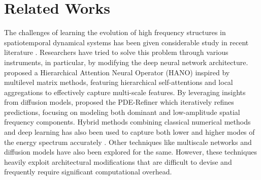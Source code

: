 \section{Related Works}
The challenges of learning the evolution of high frequency structures in spatiotemporal dynamical systems has been given considerable study in recent literature \citep{karniadakis2021physics,lai2024machine,chakraborty2024divide,chen2024physics}. Researchers have tried to solve this problem through various instruments, in particular, by modifying the deep neural network architecture. \citep{liu2024mitigating} proposed a Hierarchical Attention Neural Operator (HANO) inspired by multilevel matrix methods, featuring hierarchical self-attentions and local aggregations to effectively capture multi-scale features. By leveraging insights from diffusion models, \citep{lippe2023modeling} proposed the PDE-Refiner which iteratively refines predictions, focusing on modeling both dominant and low-amplitude spatial frequency components. Hybrid methods combining classical numerical methods and deep learning has also been used to capture both lower and higher modes of the energy spectrum accurately \citep{shankar2023differentiable,zhang2024blending}. Other techniques like multiscale networks \citep{wang2020multi,liu2020multi} and diffusion models \citep{oommen2024integrating} have also been explored for the same. However, these techniques heavily exploit architectural modifications that are difficult to devise and frequently require significant computational overhead. 

